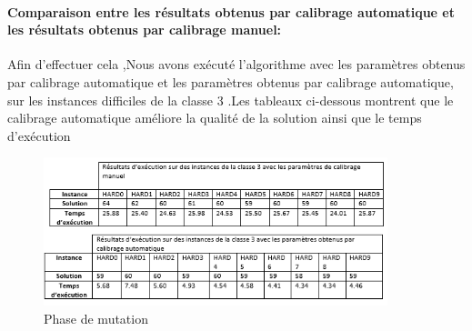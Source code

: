 \documentclass[12pt]{article}
\begin{document}
\paragraph{Comparaison entre les résultats obtenus par calibrage automatique et les résultats obtenus par calibrage manuel:                }
Afin d’effectuer cela ,Nous avons exécuté l’algorithme avec les paramètres obtenus par calibrage automatique et les paramètres obtenus par calibrage automatique, sur les instances difficiles de la classe 3 .Les tableaux ci-dessous montrent que le calibrage automatique améliore la qualité de la solution ainsi que le temps d’exécution
\begin{figure}[h!]
    \centering
     \includegraphics[width=10cm]{../figures/tabreslts.PNG}
     \caption[\small]{Phase de mutation}
 \end{figure}
\end{document}

